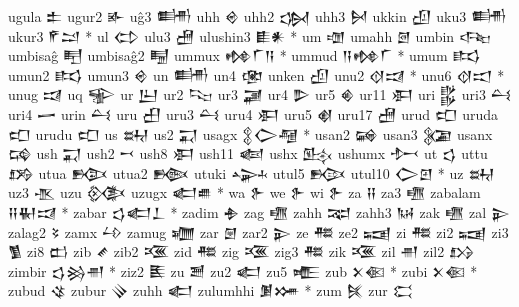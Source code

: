  ugula  𒉺   
 ugur2  𒅊   
 uĝ3  𒌦   
 uhh  𒄴   
 uhh2  𒌔   
 uhh3  𒆵   
 ukkin  𒌺   
 uku3  𒌦   
 ukur3  𒇳𒁺 *   
 ul  𒌌   
 ulu3  𒍇   
 ulushin3  𒀾𒀭 *   
 um  𒌝   
 umahh  𒇦   
 umbin  𒌢   
 umbisaĝ  𒋃   
 umbisaĝ2  𒋄   
 ummux  𒂔𒇲𒀀 *   
 ummud  𒀀𒂔𒇲 *   
 umum  𒌣   
 umun2  𒌣   
 umun3  𒄴   
 un  𒌦   
 un4  𒂬   
 unken  𒌺   
 unu2  𒋼𒀕 *   
 unu6  𒋼𒀊 *   
 unug  𒀕   
 uq  𒊌   
 ur  𒌨   
 ur2  𒌫   
 ur3  𒃡   
 ur4  𒌴   
 ur5  𒄯   
 ur11  𒀳   
 uri  𒌵   
 uri3  𒌶   
 uri4  𒅂   
 urin  𒌶   
 uru  𒌷   
 uru3  𒌶   
 uru4  𒀳   
 uru5  𒋽   
 uru17  𒍇   
 urud  𒍏   
 uruda  𒍏   
 urudu  𒍏   
 us  𒊻   
 us2  𒍑   
 usagx  𒉭𒀖𒆷     *   
 usan2  𒄝   
 usan3  𒉮   
 usanx  𒄙   
 ush  𒍑   
 ush2  𒍗   
 ush8  𒀳   
 ush11  𒅜   
 ushx  𒍖   
 ushumx  𒍘   
 ut  𒌓   
 uttu  𒋸   
 utua  𒁭   
 utua2  𒁦   
 utuki  𒍙   
 utul5  𒁟   
 utul10  𒀖𒇻 *   
 uz  𒊻   
 uz3  𒍚   
 uzu  𒍜   
 uzugx  𒅗𒌑 *   
 wa  𒉿   
 we  𒉿   
 wi  𒉿   
 za  𒍝   
 za3  𒍠   
 zabalam  𒍝𒈽𒀕 *   
 zabar  𒌓𒅗𒁇 *   
 zadim  𒈯   
 zag  𒍠   
 zahh  𒉈   
 zahh3  𒀄   
 zak  𒍠   
 zal  𒉌   
 zalag2  𒂟   
 zamx  𒍡   
 zamug  𒁾   
 zar  𒇡   
 zar2  𒉌   
 ze  𒍣   
 ze2  𒍢   
 zi  𒍣   
 zi2  𒍢   
 zi3  𒍥   
 zi8  𒆗   
 zib  𒍦   
 zib2  𒍨   
 zid  𒍣   
 zig  𒍨   
 zig3  𒍣   
 zik  𒍨   
 zil  𒉣   
 zil2  𒋳   
 zimbir  𒌓𒄒𒉣 *   
 ziz2  𒍩   
 zu  𒍪   
 zu2  𒅗   
 zu5  𒍫   
 zub  𒉽𒈿 *   
 zubi  𒉽𒈿 *   
 zubud  𒄪   
 zubur  𒍭   
 zuhh  𒅗   
 zulumhhi  𒋠𒋤 *   
 zum  𒍮   
 zur  𒀫   
